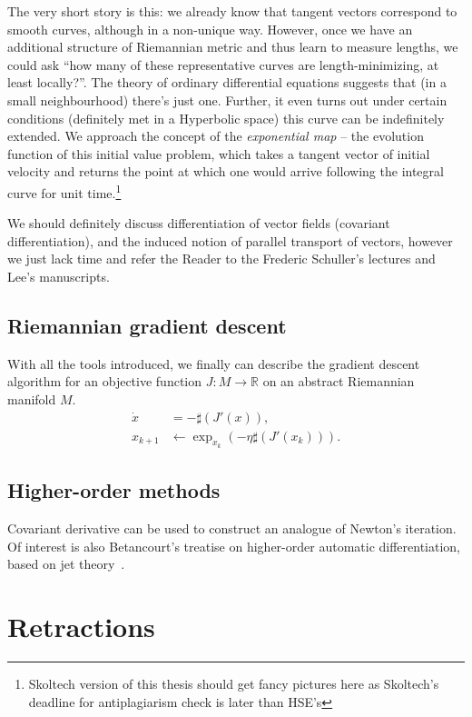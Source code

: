 The very short story is this: we already know that tangent vectors correspond
to smooth curves, although in a non-unique way. However, once we have an
additional structure of Riemannian metric and thus learn to measure lengths, we
could ask ``how many of these representative curves are length-minimizing, at
least locally?''. The theory of ordinary differential equations suggests that
(in a small neighbourhood) there's just one. Further, it even turns out under
certain conditions (definitely met in a Hyperbolic space) this curve can be
indefinitely extended. We approach the concept of the \emph{exponential map} --
the evolution function of this initial value problem, which takes a tangent
vector of initial velocity and returns the point at which one would arrive
following the integral curve for unit time.\footnote{Skoltech version of this
thesis should get fancy pictures here as Skoltech's deadline for antiplagiarism
check is later than HSE's}

We should definitely discuss differentiation of vector fields (covariant
differentiation), and the induced notion of parallel transport of vectors,
however we just lack time and refer the Reader to the Frederic Schuller's
lectures and Lee's manuscripts.

\subsection*{Riemannian gradient descent}

With all the tools introduced, we finally can describe the gradient descent
algorithm for an objective function \( J: M \to \mathbb{R} \) on an abstract
Riemannian manifold \( M \).
\begin{align*}
\dot x &= -\sharp(J'(x)),\\
x_{k+1} &\leftarrow \exp_{x_k}(-\eta \sharp(J'(x_k))).
\end{align*}

\subsection*{Higher-order methods}

Covariant derivative can be used to construct an analogue of Newton's
iteration. Of interest is also Betancourt's treatise on higher-order automatic
differentiation, based on jet theory~\cite{betancourt2018geometric}.

\section*{Retractions}

